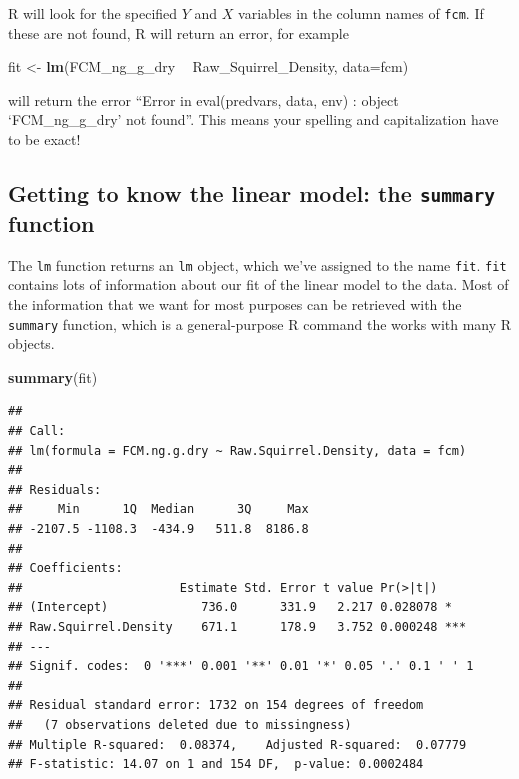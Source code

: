 \documentclass[]{book}
\newenvironment{Shaded}{\begin{snugshade}}{\end{snugshade}}
\newcommand{\KeywordTok}[1]{\textcolor[rgb]{0.13,0.29,0.53}{\textbf{#1}}}
\newcommand{\DataTypeTok}[1]{\textcolor[rgb]{0.13,0.29,0.53}{#1}}
\newcommand{\StringTok}[1]{\textcolor[rgb]{0.31,0.60,0.02}{#1}}
\newcommand{\OperatorTok}[1]{\textcolor[rgb]{0.81,0.36,0.00}{\textbf{#1}}}
\newcommand{\NormalTok}[1]{#1}
\begin{document}
R will look for the specified \(Y\) and \(X\) variables in the column
names of \texttt{fcm}. If these are not found, R will return an error,
for example

\begin{Shaded}
\begin{Highlighting}[]
\NormalTok{  fit <-}\StringTok{ }\KeywordTok{lm}\NormalTok{(FCM_ng_g_dry }\OperatorTok{~}\StringTok{ }\NormalTok{Raw_Squirrel_Density, }\DataTypeTok{data=}\NormalTok{fcm)}
\end{Highlighting}
\end{Shaded}

will return the error ``Error in eval(predvars, data, env) : object
`FCM\_ng\_g\_dry' not found''. This means your spelling and
capitalization have to be exact!

\subsection{\texorpdfstring{Getting to know the linear model: the
\texttt{summary}
function}{Getting to know the linear model: the summary function}}\label{getting-to-know-the-linear-model-the-summary-function}

The \texttt{lm} function returns an \texttt{lm} object, which we've
assigned to the name \texttt{fit}. \texttt{fit} contains lots of
information about our fit of the linear model to the data. Most of the
information that we want for most purposes can be retrieved with the
\texttt{summary} function, which is a general-purpose R command the
works with many R objects.

\begin{Shaded}
\begin{Highlighting}[]
\KeywordTok{summary}\NormalTok{(fit)}
\end{Highlighting}
\end{Shaded}

\begin{verbatim}
## 
## Call:
## lm(formula = FCM.ng.g.dry ~ Raw.Squirrel.Density, data = fcm)
## 
## Residuals:
##     Min      1Q  Median      3Q     Max 
## -2107.5 -1108.3  -434.9   511.8  8186.8 
## 
## Coefficients:
##                      Estimate Std. Error t value Pr(>|t|)    
## (Intercept)             736.0      331.9   2.217 0.028078 *  
## Raw.Squirrel.Density    671.1      178.9   3.752 0.000248 ***
## ---
## Signif. codes:  0 '***' 0.001 '**' 0.01 '*' 0.05 '.' 0.1 ' ' 1
## 
## Residual standard error: 1732 on 154 degrees of freedom
##   (7 observations deleted due to missingness)
## Multiple R-squared:  0.08374,    Adjusted R-squared:  0.07779 
## F-statistic: 14.07 on 1 and 154 DF,  p-value: 0.0002484
\end{verbatim}
\end{document}
